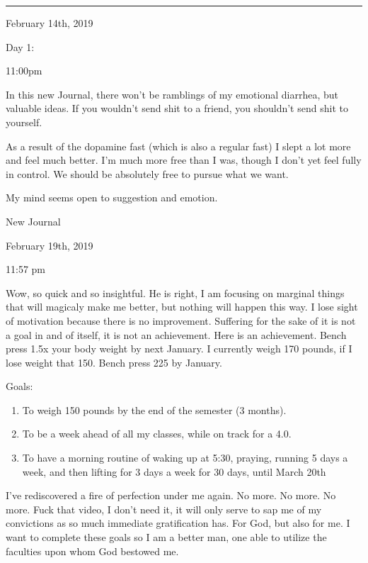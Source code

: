 \begin{center}\rule{0.5\linewidth}{\linethickness}\end{center}

\bigskip
\bigskip
February 14th, 2019

Day 1:

11:00pm

In this new Journal, there won't be ramblings of my emotional diarrhea,
but valuable ideas. If you wouldn't send shit to a friend, you shouldn't
send shit to yourself.

As a result of the dopamine fast (which is also a regular fast) I slept
a lot more and feel much better. I'm much more free than I was, though I
don't yet feel fully in control. We should be absolutely free to pursue
what we want.

My mind seems open to suggestion and emotion.

New Journal

\bigskip
\bigskip
February 19th, 2019

11:57 pm

Wow, so quick and so insightful. He is right, I am focusing on marginal
things that will magicaly make me better, but nothing will happen this
way. I lose sight of motivation because there is no improvement.
Suffering for the sake of it is not a goal in and of itself, it is not
an achievement. Here is an achievement. Bench press 1.5x your body
weight by next January. I currently weigh 170 pounds, if I lose weight
that 150. Bench press 225 by January.

Goals:

\begin{enumerate}
\def\labelenumi{\arabic{enumi})}
\item
  To weigh 150 pounds by the end of the semester (3 months).
\item
  To be a week ahead of all my classes, while on track for a 4.0.
\item
  To have a morning routine of waking up at 5:30, praying, running 5
  days a week, and then lifting for 3 days a week for 30 days, until
  March 20th
\end{enumerate}

I've rediscovered a fire of perfection under me again. No more. No more.
No more. Fuck that video, I don't need it, it will only serve to sap me
of my convictions as so much immediate gratification has. For God, but
also for me. I want to complete these goals so I am a better man, one
able to utilize the faculties upon whom God bestowed me.

